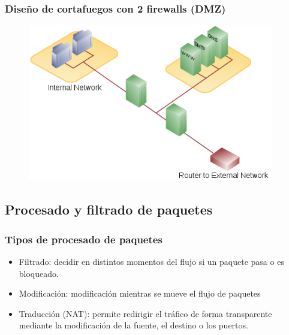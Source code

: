 \documentclass{beamer}
\begin{document}

\begin{frame}
\frametitle{Diseño de cortafuegos con 2 firewalls (DMZ)}

\begin{figure}[h]

\begin{center}
  \centering
  \includegraphics[height=2.7in]{figs/500px-DMZ_network_diagram_2_firewall.png}
\end{center}
\end{figure}

\end{frame}


\subsection{Procesado y filtrado de paquetes}

\begin{frame}
\frametitle{Tipos de procesado de paquetes}

\begin{itemize}
\item \alert{Filtrado:} decidir en distintos momentos del flujo si un paquete pasa o es bloqueado.
\item \alert{Modificación:} modificación mientras se mueve el flujo de paquetes
\item \alert{Traducción (NAT)}: permite redirigir el tráfico de forma transparente mediante la modificación de la fuente, el destino o los puertos.
\end{itemize}

\end{frame}
\end{document}
